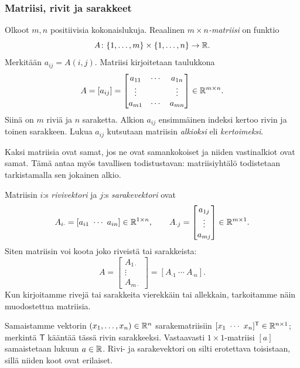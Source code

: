 \documentclass[11pt,a4paper]{amsart}
\begin{document}
  \subsubsection*{Matriisi, rivit ja sarakkeet}

  \begin{definition}[Matriisi]
    Olkoot $m,n$ positiivisia kokonaislukuja. Reaalinen
    \emph{$m\times n$-matriisi} on funktio
    \[
      A\colon\{1,\ldots,m\}\times\{1,\ldots,n\}\to\mathbb{R}.
    \]
    Merkitään $a_{ij}=A(i,j)$. Matriisi kirjoitetaan taulukkona
    \[
      A=[a_{ij}]=
      \begin{bmatrix}
        a_{11}&\cdots&a_{1n}\\
        \vdots&&\vdots\\
        a_{m1}&\cdots&a_{mn}
      \end{bmatrix}\in\mathbb{R}^{m\times n}.
    \]
    Siinä on $m$ riviä ja $n$ saraketta. Alkion $a_{ij}$ ensimmäinen
    indeksi kertoo rivin ja toinen sarakkeen. Lukua $a_{ij}$ kutsutaan
    matriisin \emph{alkioksi} eli \emph{kertoimeksi}.
  \end{definition}

  Kaksi matriisia ovat samat, jos ne ovat samankokoiset ja niiden
  vastinalkiot ovat samat. Tämä antaa myös tavallisen todistustavan:
  matriisiyhtälö todistetaan tarkistamalla sen jokainen alkio.

  Matriisin $i$:s \emph{rivivektori} ja $j$:s \emph{sarakevektori} ovat
  \[
    A_{i\cdot}=[a_{i1}\ \cdots\ a_{in}]\in\RR^{1\times n},
    \qquad
    A_{\cdot j}=
    \begin{bmatrix}a_{1j}\\\vdots\\a_{mj}
    \end{bmatrix}
    \in\RR^{m\times1}.
  \]
  Siten matriisin voi koota joko riveistä tai sarakkeista:
  \[
    A=
    \begin{bmatrix}A_{1\cdot}\\\vdots\\A_{m\cdot}
    \end{bmatrix}
    =[A_{\cdot1}\ \cdots\ A_{\cdot n}].
  \]
  Kun kirjoitamme rivejä tai sarakkeita vierekkäin tai allekkain,
  tarkoitamme näin muodostettua matriisia.

  \begin{remark}
    Samaistamme vektorin $(x_1,\ldots,x_n)\in\mathbb{R}^n$ sarakematriisiin
    $[x_1\ \cdots\ x_n]^{\mathsf T}\in\mathbb{R}^{n\times1}$; merkintä
    $\mathsf T$ kääntää tässä rivin sarakkeeksi.
    Vastaavasti $1\times1$-matriisi $[a]$ samaistetaan lukuun $a\in\mathbb{R}$.
    Rivi- ja sarakevektori on silti erotettava toisistaan, sillä niiden
    koot ovat erilaiset.
  \end{remark}
\end{document}
